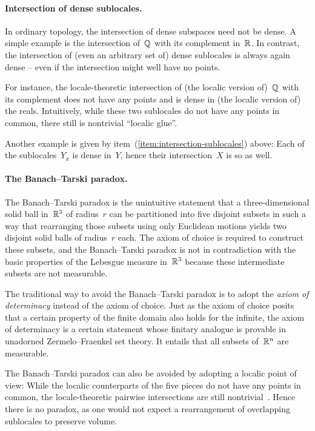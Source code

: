 \documentclass{ws-rv9x6}
\begin{document}
{\paragraph{Intersection of dense sublocales.} In ordinary topology, the
intersection of dense subspaces need not be dense. A simple example is the
intersection of~$\mathbb{Q}$ with its complement in~$\mathbb{R}$. In contrast, the
intersection of (even an arbitrary set of) dense sublocales is always again
dense -- even if the intersection might well have no points.

For instance, the locale-theoretic intersection of (the localic version
of)~$\mathbb{Q}$ with its complement does not have any points and is dense in (the
localic version of) the reals. Intuitively, while these two sublocales do not
have any points in common, there still is nontrivial ``localic glue''.


Another example is given by item~(\ref{item:intersection-sublocales}) above:
Each of the sublocales~$Y_x$ is dense in~$Y$, hence their intersection~$X$ is
so as well.


\paragraph{The Banach--Tarski paradox.} The Banach--Tarski paradox is the
unintuitive statement that a three-dimensional solid ball in~$\mathbb{R}^3$ of
radius~$r$ can be partitioned into five disjoint subsets in such a way that
rearranging those subsets using only Euclidean motions yields two disjoint
solid balls of radius~$r$ each. The axiom of choice is required to construct
these subsets, and the Banach--Tarski paradox is not in
contradiction with the basic properties of the Lebesgue measure in~$\mathbb{R}^3$
because these intermediate subsets are not measurable.

The traditional way to avoid the Banach--Tarski paradox is to adopt the
\emph{axiom of determinacy} instead of the axiom of choice. Just as the axiom
of choice posits that a certain property of the finite domain also holds for the
infinite, the axiom of determinacy is a certain statement whose finitary
analogue is provable in unadorned Zermelo--Fraenkel set theory. It entails that
all subsets of~$\mathbb{R}^n$ are measurable.

The Banach--Tarski paradox can also be avoided by adopting a localic point of
view: While the localic counterparts of the five pieces do not have any points
in common, the locale-theoretic pairwise intersections are still nontrivial~\cite{simpson:measure}.
Hence there is no paradox, as one would not expect a rearrangement of
overlapping sublocales to preserve volume.


}
\end{document}

